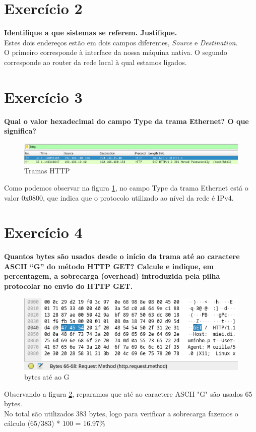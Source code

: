 \documentclass[a4paper]{report}
\begin{document}
\section{Exercício 2}
\textbf{Identifique a que sistemas se referem. Justifique.}\\
Estes dois endereços estão em dois campos diferentes, \textit{Source} e
\textit{Destination}.\\
O primeiro corresponde à interface da nossa máquina nativa. O segundo
corresponde ao router da rede local à qual estamos ligados.

\section{Exercício 3}
\textbf{Qual o valor hexadecimal do campo Type da trama Ethernet? O que
significa?}

\begin{figure}[H]
    \centering 
    \includegraphics[width=\textwidth]{images/tramasHttp.png}  
    \caption{Tramas HTTP}
    \label{fig:tramasHttp}
\end{figure}
Como podemos observar na figura \ref{fig:tramasHttp}, no campo Type da trama
Ethernet está o valor 0x0800, que indica que o protocolo utilizado ao nível da
rede é IPv4.

\section{Exercício 4}
\textbf{Quantos bytes são usados desde o início da trama até ao caractere ASCII
“G” do método HTTP GET? Calcule e indique, em percentagem, a sobrecarga
(overhead) introduzida pela pilha protocolar no envio do HTTP GET.}

\begin{figure}[H]
    \centering 
    \includegraphics[width=\textwidth]{images/bytes2G.png}
    \caption{bytes até ao G}
    \label{fig:bytes2G}
\end{figure}
Observando a figura \ref{fig:bytes2G}, reparamos que até ao caractere ASCII "G"
são usados 65 bytes.\\
No total são utilizados 383 bytes, logo para verificar a sobrecarga fazemos o
cálculo (65/383) * 100 = 16.97\%
\end{document}
